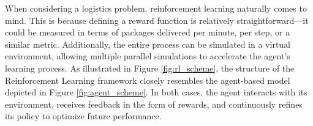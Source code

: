 





When considering a logistics problem, reinforcement learning naturally comes to
mind. This is because defining a reward function is relatively straightforward—it
could be measured in terms of packages delivered per minute, per step, or a similar
metric. Additionally, the entire process can be simulated in a virtual environment,
allowing multiple parallel simulations to accelerate the agent's learning
process. As illustrated in Figure \ref{fig:rl_scheme}, the structure of the
Reinforcement Learning framework closely resembles the agent-based model
depicted in Figure \ref{fig:agent_scheme}. In both cases, the agent interacts
with its environment, receives feedback in the form of rewards, and continuously
refines its policy to optimize future performance.

